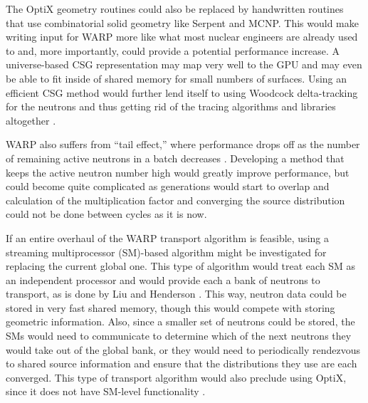 \documentclass[preprint,12pt]{elsarticle}
\begin{document}
The OptiX geometry routines could also be replaced by handwritten routines that use combinatorial solid geometry like Serpent and MCNP.  This would make writing input for WARP more like what most nuclear engineers are already used to and, more importantly, could provide a potential performance increase.  A universe-based CSG representation may map very well to the GPU and may even be able to fit inside of shared memory for small numbers of surfaces.  Using an efficient CSG method would further lend itself to using Woodcock delta-tracking for the neutrons and thus getting rid of the tracing algorithms and libraries altogether \cite{serp_delta}.   

WARP also suffers from ``tail effect,'' where performance drops off as the number of remaining active neutrons in a batch decreases \cite{algorithms}.  Developing a method that keeps the active neutron number high would greatly improve performance, but could become quite complicated as generations would start to overlap and calculation of the multiplication factor and converging the source distribution could not be done between cycles as it is now.  

If an entire overhaul of the WARP transport algorithm is feasible, using a streaming multiprocessor (SM)-based algorithm might be investigated for replacing the current global one.  This type of algorithm would treat each SM as an independent processor and would provide each a bank of neutrons to transport, as is done by Liu and Henderson \cite{tianyu,henderson}.   This way, neutron data could be stored in very fast shared memory, though this would compete with storing geometric information.  Also, since a smaller set of neutrons could be stored, the SMs would need to communicate to determine which of the next neutrons they would take out of the global bank, or they would need to periodically rendezvous to shared source information and ensure that the distributions they use are each converged.  This type of transport algorithm would also preclude using OptiX, since it does not have SM-level functionality \cite{optix}.
\end{document}
